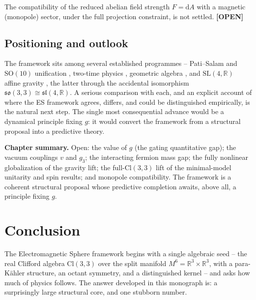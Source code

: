 \documentclass[11pt,oneside]{book}
\newcommand{\Cl}{\mathrm{Cl}}                     %
\newcommand{\dd}{\mathrm{d}}
\newcommand{\RR}{\mathbb{R}}
\newcommand{\so}{\mathfrak{so}}
\newcommand{\status}[1]{{\sffamily\bfseries\color{statuscol}[#1]}}
\theoremstyle{plain}
\theoremstyle{definition}
\theoremstyle{remark}
\begin{document}
The compatibility of the reduced abelian field strength $F=\dd A$ with a magnetic
(monopole) sector, under the full projection constraint, is not settled.
\status{OPEN}

\section{Positioning and outlook}
\label{sec:outlook}

The framework sits among several established programmes -- Pati--Salam and
$\mathrm{SO}(10)$ unification \cite{PatiSalam1974,FritzschMinkowski1975}, two-time
physics \cite{Bars1998a,Bars1998b,Bars2008}, geometric algebra
\cite{Hestenes1966,DoranLasenby2003}, and $\mathrm{SL}(4,\RR)$ affine gravity
\cite{NeemanSijacki1988}, the latter through the accidental isomorphism
$\so(3,3)\cong\mathfrak{sl}(4,\RR)$. A serious comparison with each, and an explicit
account of where the ES framework agrees, differs, and could be distinguished
empirically, is the natural next step. The single most consequential advance would
be a dynamical principle fixing $g$: it would convert the framework from a
structural proposal into a predictive theory.

\begin{leavesbox}
\textbf{Chapter summary.} Open: the value of $g$ (the gating quantitative gap); the
vacuum couplings $v$ and $g_3$; the interacting fermion mass gap; the fully
nonlinear globalization of the gravity lift; the full-$\Cl(3,3)$ lift of the
minimal-model unitarity and spin results; and monopole compatibility. The framework
is a coherent structural proposal whose predictive completion awaits, above all, a
principle fixing $g$.
\end{leavesbox}

\chapter*{Conclusion}

The Electromagnetic Sphere framework begins with a single algebraic seed -- the real
Clifford algebra $\Cl(3,3)$ over the split manifold $M^6=\RR^3\times\RR^3$, with a
para-K\"ahler structure, an octant symmetry, and a distinguished kernel -- and asks
how much of physics follows. The answer developed in this monograph is: a
surprisingly large structural core, and one stubborn number.
\end{document}
